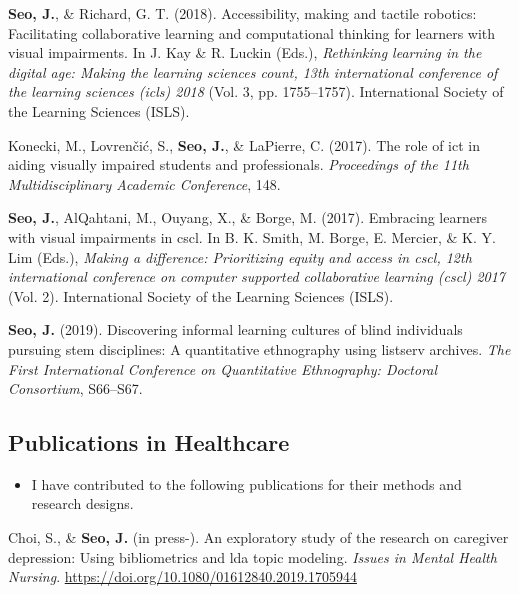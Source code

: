 \documentclass[11pt, a4paper]{awesome-cv}
\providecommand{\tightlist}{%
	\setlength{\itemsep}{0pt}\setlength{\parskip}{0pt}}
\begin{document}
\leavevmode\hypertarget{ref-seo2018accessibility}{}%
\textbf{Seo, J.}, \& Richard, G. T. (2018). Accessibility, making and tactile robotics: Facilitating collaborative learning and computational thinking for learners with visual impairments. In J. Kay \& R. Luckin (Eds.), \emph{Rethinking learning in the digital age: Making the learning sciences count, 13th international conference of the learning sciences (icls) 2018} (Vol. 3, pp. 1755--1757). International Society of the Learning Sciences (ISLS).

\leavevmode\hypertarget{ref-konecki2017role}{}%
Konecki, M., Lovrenčić, S., \textbf{Seo, J.}, \& LaPierre, C. (2017). The role of ict in aiding visually impaired students and professionals. \emph{Proceedings of the 11th Multidisciplinary Academic Conference}, 148.

\leavevmode\hypertarget{ref-seo2017embracing}{}%
\textbf{Seo, J.}, AlQahtani, M., Ouyang, X., \& Borge, M. (2017). Embracing learners with visual impairments in cscl. In B. K. Smith, M. Borge, E. Mercier, \& K. Y. Lim (Eds.), \emph{Making a difference: Prioritizing equity and access in cscl, 12th international conference on computer supported collaborative learning (cscl) 2017} (Vol. 2). International Society of the Learning Sciences (ISLS).

\leavevmode\hypertarget{ref-seo2019discovering}{}%
\textbf{Seo, J.} (2019). Discovering informal learning cultures of blind individuals pursuing stem disciplines: A quantitative ethnography using listserv archives. \emph{The First International Conference on Quantitative Ethnography: Doctoral Consortium}, S66--S67.

\endgroup

\hypertarget{publications-in-healthcare}{%
\subsection{Publications in Healthcare}\label{publications-in-healthcare}}

\begin{itemize}
\tightlist
\item
  I have contributed to the following publications for their methods and research designs.
\end{itemize}

\begingroup
\setlength{\parindent}{-0.5in}
\setlength{\leftskip}{0.5in}

\hypertarget{refs_healthcare}{}
\leavevmode\hypertarget{ref-mentalhealth}{}%
Choi, S., \& \textbf{Seo, J.} (in press-). An exploratory study of the research on caregiver depression: Using bibliometrics and lda topic modeling. \emph{Issues in Mental Health Nursing}. \url{https://doi.org/10.1080/01612840.2019.1705944}
\end{document}
